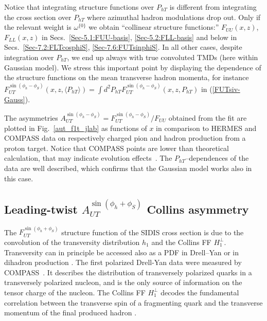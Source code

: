 \documentclass[a4paper,11pt]{article}
\newcommand{\red}[1]{{\color{red} #1}}
\newcommand{\la}{\langle}
\newcommand{\ra}{\rangle}
\newcommand{\AP}[1]{\red{#1}}
\def\Phperp{P_{hT}}
\begin{document}
Notice that integrating structure functions over $\Phperp$
is different from integrating the cross section over $\Phperp$
where azimuthal hadron modulations drop out. 
Only if the relevant weight is $\omega^{\{0\}}$ we obtain
``collinear structure functions:''  $F_{UU}(x,z)$, $F_{LL}(x,z)$ 
in Secs.~\ref{Sec-5.1:FUU-basis}, \ref{Sec-5.2:FLL-basis}
and below in Secs.~\ref{Sec-7.2:FLTcosphiS}, \ref{Sec-7.6:FUTsinphiS}.
In all other cases, despite integration over $\Phperp$, we end up 
always with true convoluted TMDs (here within Gaussian model).
We stress this important point by displaying the dependence of 
the structure functions on the mean transverse hadron momenta, for instance
$F_{UT}^{\sin(\phi_h-\phi_S)}(x,z,\la\Phperp\ra) = 
\int d^2\Phperp F_{UT}^{\sin(\phi_h-\phi_S)}(x,z,\Phperp)$
in (\ref{FUTsiv-Gauss}).

The asymmetries $A_{UT}^{\sin(\phi_h-\phi_S)}= F_{UT}^{\sin(\phi_h-\phi_S)}/F_{UU}$  
obtained from the fit \cite{Anselmino:2011gs}
are plotted in Fig.~\ref{aut_f1t_jlab} as functions of $x$ in comparison 
to HERMES \cite{Airapetian:2009ae} and COMPASS \cite{Adolph:2012sp} data 
on respectively charged pion and hadron production from a proton target. \AP{Notice that COMPASS points are lower than theoretical calculation, that may indicate evolution effects~\cite{Aybat:2011ta, Anselmino:2012aa}}.
The $P_{hT}$--dependences of the data are well described, which
confirms that the Gaussian model works also in this case.


\subsection{\boldmath Leading-twist $A_{UT}^{\sin(\phi_h+\phi_S)}$ Collins asymmetry}
\label{Sec-5.4:Collins-basis}

The $F_{UT}^{\sin(\phi_h+\phi_S)}$ \AP{structure function} of the SIDIS cross section is due 
to the convolution of the transversity distribution $h_1$ and the Collins 
FF $H_1^\perp$. Transversity can in principle be accessed also as a PDF in
Drell--Yan or in dihadron production 
\cite{Bacchetta:2002ux,Bacchetta:2003vn,Bacchetta:2011ip,Bacchetta:2012ty,
Radici:2015mwa,Radici:2018iag}. \AP{The first polarized Drell-Yan data were measured by COMPASS~\cite{Aghasyan:2017jop,Parsamyan:2018zju}.}
It describes the distribution of transversely polarized quarks
in a transversely polarized nucleon, and is the only source of information 
on the tensor charge of the nucleon. The Collins FF $H_1^\perp$ decodes the 
fundamental correlation between the transverse spin of a fragmenting quark 
and the transverse momentum of the final produced hadron \cite{Collins:1992kk}.
\end{document}
